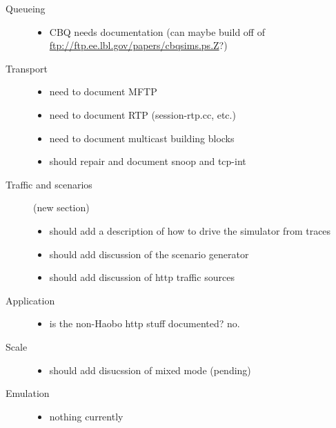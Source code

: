 \begin{description}
\item[Queueing]

        \begin{itemize}
        \item CBQ needs documentation (can maybe build off of 
                \url{ftp://ftp.ee.lbl.gov/papers/cbqsims.ps.Z}?)
        \end{itemize}

\item[Transport]

        \begin{itemize}
        \item need to document MFTP
        \item need to document RTP (session-rtp.cc, etc.)
        \item need to document multicast building blocks
        \item should repair and document snoop and tcp-int
        \end{itemize}

\item[Traffic and scenarios] (new section)

        \begin{itemize}
        \item should add a description of how to drive the simulator
                from traces
        \item should add discussion of the scenario generator
        \item should add discussion of http traffic sources
        \end{itemize}

\item[Application]

        \begin{itemize}
        \item is the non-Haobo http stuff documented? no.
        \end{itemize}

\item[Scale]

        \begin{itemize}
        \item should add disucssion of mixed mode (pending)
        \end{itemize}

\item[Emulation]

        \begin{itemize}
        \item nothing currently
        \end{itemize}


\end{description}
